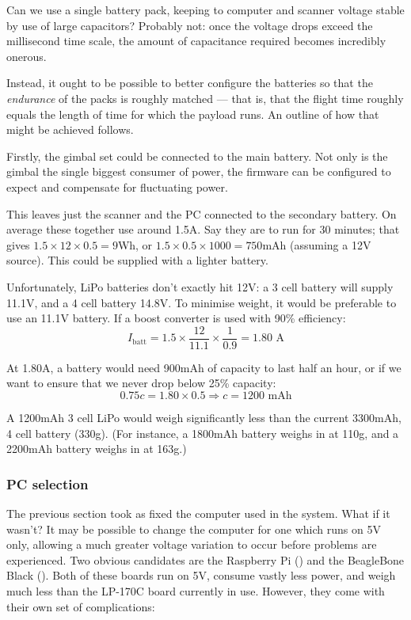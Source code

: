 \documentclass[12pt,oneside,a4paper]{book}
\begin{document}
Can we use a single battery pack, keeping to computer and scanner
voltage stable by use of large capacitors? Probably not: once the
voltage drops exceed the millisecond time scale, the amount of
capacitance required becomes incredibly onerous.

Instead, it ought to be possible to better configure the batteries so
that the \emph{endurance} of the packs is roughly matched --- that is,
that the flight time roughly equals the length of time for which the
payload runs. An outline of how that might be achieved follows.

Firstly, the gimbal set could be connected to the main battery. Not
only is the gimbal the single biggest consumer of power, the firmware
can be configured to expect and compensate for fluctuating power.

This leaves just the scanner and the PC connected to the secondary
battery. On average these together use around 1.5A.  Say they are to
run for 30 minutes; that gives $1.5 \times 12 \times 0.5 = 9$Wh, or
$1.5 \times 0.5 \times 1000 = 750$mAh (assuming a 12V source). This
could be supplied with a lighter battery.

Unfortunately, LiPo batteries don't exactly hit 12V: a 3 cell battery
will supply 11.1V, and a 4 cell battery 14.8V. To minimise weight, it
would be preferable to use an 11.1V battery. If a boost converter is
used with 90\% efficiency:
\begin{equation}
  \label{eq:2}
  I_{\text{batt}} = 1.5 \times \frac{12}{11.1} \times \frac{1}{0.9} =
  1.80 \text{ A}
\end{equation}

At 1.80A, a battery would need 900mAh of capacity to last half an
hour, or if we want to ensure that we never drop below 25\% capacity:
\begin{equation}
  \label{eq:3}
  0.75c = 1.80 \times 0.5 \Rightarrow c = 1200 \text{ mAh}
\end{equation}

A 1200mAh 3 cell LiPo would weigh significantly less than the current
3300mAh, 4 cell battery (330g). (For instance, a 1800mAh battery weighs
in at 110g, and a 2200mAh battery weighs in at 163g.)

\subsubsection{PC selection}
\label{sec:electr-gener}

The previous section took as fixed the computer used in the
system. What if it wasn't? It may be possible to change the computer
for one which runs on 5V only, allowing a much greater voltage
variation to occur before problems are experienced. Two obvious
candidates are the Raspberry Pi () and the BeagleBone Black
(). Both of these boards run on 5V, consume vastly less
power, and weigh much less than the LP-170C board currently in
use. However, they come with their own set of complications:
\end{document}
